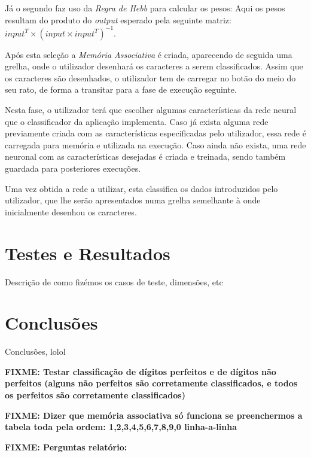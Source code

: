 \documentclass{article}
\begin{document}
Já o segundo faz uso da \emph{Regra de Hebb} para calcular os pesos: Aqui os pesos resultam do produto do \emph{output} esperado pela seguinte matriz: $input^{T}\times \left(input\times input^{T}\right)^{-1}$.

Após esta seleção a \emph{Memória Associativa} é criada, aparecendo de seguida uma grelha, onde o utilizador desenhará os caracteres a serem classificados. Assim que os caracteres são desenhados, o utilizador tem de carregar no botão do meio do seu rato, de forma a transitar para a fase de execução seguinte.

Nesta fase, o utilizador terá que escolher algumas características da rede neural que o classificador da aplicação implementa. Caso já exista alguma rede previamente criada com as características especificadas pelo utilizador, essa rede é carregada para memória e utilizada na execução. Caso ainda não exista, uma rede neuronal com as características desejadas é criada e treinada, sendo também guardada para posteriores execuções. 

Uma vez obtida a rede a utilizar, esta classifica os dados introduzidos pelo utilizador, que lhe serão apresentados numa grelha semelhante à onde inicialmente desenhou os caracteres.


\pagebreak

\section{Testes e Resultados}

Descrição de como fizémos os casos de teste, dimensões, etc

\pagebreak

\section{Conclusões}

Conclusões, lolol

\pagebreak

\textbf{FIXME: Testar classificação de dígitos perfeitos e de dígitos não perfeitos (alguns não perfeitos são corretamente classificados, e todos os perfeitos são corretamente classificados)}

\textbf{FIXME: Dizer que memória associativa só funciona se preenchermos a tabela toda pela ordem: 1,2,3,4,5,6,7,8,9,0 linha-a-linha}

\vspace{.3cm}

\textbf{FIXME: Perguntas relatório:}
\end{document}
